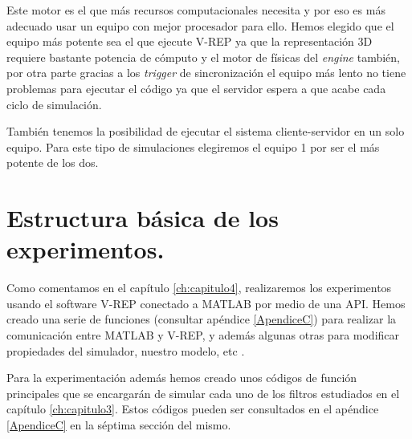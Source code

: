Este motor es el que más recursos computacionales necesita y por eso es más adecuado usar un equipo con mejor procesador para ello.
%
%
%
Hemos elegido que el equipo más potente sea el que ejecute V-REP ya que la representación 3D requiere bastante potencia de cómputo y el motor de físicas del \textit{engine} también, por otra parte gracias a los \textit{trigger} de sincronización el equipo más lento no tiene problemas para ejecutar el código ya que el servidor espera a que acabe cada ciclo de simulación.

También tenemos la posibilidad de ejecutar el sistema cliente-servidor en un solo equipo.
Para este tipo de simulaciones elegiremos el equipo 1 por ser el más potente de los dos.

\section{Estructura básica de los experimentos.}
%
%
%
%
%

Como comentamos en el capítulo \ref{ch:capitulo4}, realizaremos los experimentos usando el software V-REP conectado a MATLAB por medio de una API.
Hemos creado una serie de funciones (consultar apéndice \ref{ApendiceC}) para realizar la comunicación entre MATLAB y V-REP, y además algunas otras para modificar propiedades del simulador, nuestro modelo, etc .

Para la experimentación además hemos creado unos códigos de función principales que se encargarán de simular cada uno de los filtros estudiados en el capítulo \ref{ch:capitulo3}.
Estos códigos pueden ser consultados en el apéndice \ref{ApendiceC} en la séptima sección del mismo.

